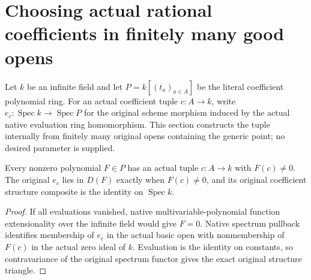 \section{Choosing actual rational coefficients in finitely many good opens}

Let $k$ be an infinite field and let $P=k[(t_a)_{a\in A}]$ be the literal
coefficient polynomial ring.  For an actual coefficient tuple $c:A\to k$,
write $e_c:\operatorname{Spec}k\to\operatorname{Spec}P$ for the original
scheme morphism induced by the actual native evaluation ring homomorphism.
This section constructs the tuple internally from finitely many original
opens containing the generic point; no desired parameter is supplied.

\begin{lemma}
\label{lem:kn-nadel-bertini-rational-evaluation}
\leanok
Every nonzero polynomial $F\in P$ has an actual tuple $c:A\to k$ with
$F(c)\ne0$.  The original $e_c$ lies in $D(F)$ exactly when $F(c)\ne0$,
and its original coefficient structure composite is the identity on
$\operatorname{Spec}k$.
\end{lemma}
\begin{proof}
If all evaluations vanished, native multivariable-polynomial function
extensionality over the infinite field would give $F=0$.  Native spectrum
pullback identifies membership of $e_c$ in the actual basic open with
nonmembership of $F(c)$ in the actual zero ideal of $k$.  Evaluation is the
identity on constants, so contravariance of the original spectrum functor
gives the exact original structure triangle.
\end{proof}

